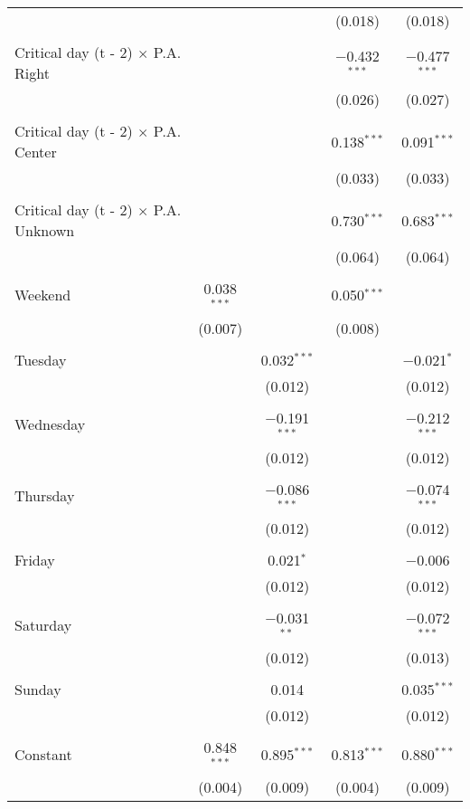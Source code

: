 \documentclass[
]{article}
\begin{document}
\begin{table}[!htbp]
{\begin{tabular}{@{\extracolsep{5pt}}lcccc}
  &  &  & (0.018) & (0.018) \\ 
  & & & & \\ 
 Critical day (t - 2) $\times$ P.A. Right &  &  & $-$0.432$^{***}$ & $-$0.477$^{***}$ \\ 
  &  &  & (0.026) & (0.027) \\ 
  & & & & \\ 
 Critical day (t - 2) $\times$ P.A. Center &  &  & 0.138$^{***}$ & 0.091$^{***}$ \\ 
  &  &  & (0.033) & (0.033) \\ 
  & & & & \\ 
 Critical day (t - 2) $\times$ P.A. Unknown &  &  & 0.730$^{***}$ & 0.683$^{***}$ \\ 
  &  &  & (0.064) & (0.064) \\ 
  & & & & \\ 
 Weekend & 0.038$^{***}$ &  & 0.050$^{***}$ &  \\ 
  & (0.007) &  & (0.008) &  \\ 
  & & & & \\ 
 Tuesday &  & 0.032$^{***}$ &  & $-$0.021$^{*}$ \\ 
  &  & (0.012) &  & (0.012) \\ 
  & & & & \\ 
 Wednesday &  & $-$0.191$^{***}$ &  & $-$0.212$^{***}$ \\ 
  &  & (0.012) &  & (0.012) \\ 
  & & & & \\ 
 Thursday &  & $-$0.086$^{***}$ &  & $-$0.074$^{***}$ \\ 
  &  & (0.012) &  & (0.012) \\ 
  & & & & \\ 
 Friday &  & 0.021$^{*}$ &  & $-$0.006 \\ 
  &  & (0.012) &  & (0.012) \\ 
  & & & & \\ 
 Saturday &  & $-$0.031$^{**}$ &  & $-$0.072$^{***}$ \\ 
  &  & (0.012) &  & (0.013) \\ 
  & & & & \\ 
 Sunday &  & 0.014 &  & 0.035$^{***}$ \\ 
  &  & (0.012) &  & (0.012) \\ 
  & & & & \\ 
 Constant & 0.848$^{***}$ & 0.895$^{***}$ & 0.813$^{***}$ & 0.880$^{***}$ \\ 
  & (0.004) & (0.009) & (0.004) & (0.009) \\ 

\end{tabular}}
\end{table}
\end{document}
